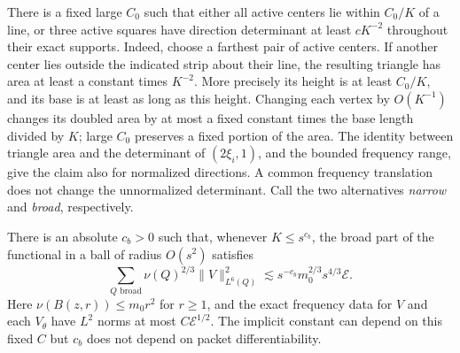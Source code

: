 There is a fixed large $C_0$ such that either all active centers lie
within $C_0/K$ of a line, or three active squares have direction
determinant at least $cK^{-2}$ throughout their exact supports.  Indeed,
choose a farthest pair of active centers.  If another center lies outside
the indicated strip about their line, the resulting triangle has area
at least a constant times $K^{-2}$.  More precisely its height is at
least $C_0/K$, and its base is at least as long as this height.  Changing
each vertex by $O(K^{-1})$ changes its doubled area by at most a fixed
constant times the base length divided by $K$; large $C_0$ preserves a
fixed portion of the area.  The identity between triangle area and the
determinant of $(2\xi_i,1)$, and the bounded frequency range, give the
claim also for normalized directions.  A common frequency translation
does not change the unnormalized determinant.  Call the two alternatives
\emph{narrow} and \emph{broad}, respectively.

\begin{lemma}\label{lem:sparse-broad}
There is an absolute $c_b>0$ such that, whenever $K\le s^{c_b}$, the
broad part of the functional in a ball of radius $O(s^2)$ satisfies
\begin{equation}\label{eq:sparse-broad}
 \sum_{Q\text{ broad}}\nu(Q)^{2/3}\|V\|_{L^6(Q)}^2
       \lesssim s^{-c_b}m_0^{2/3}s^{4/3}\mathcal E.
\end{equation}
Here $\nu(B(z,r))\le m_0r^2$ for $r\ge1$, and the exact frequency
data for $V$ and each $V_\theta$ have $L^2$ norms at most
$C\mathcal E^{1/2}$.  The implicit constant can depend on this fixed
$C$ but $c_b$ does not depend on packet differentiability.
\end{lemma}

